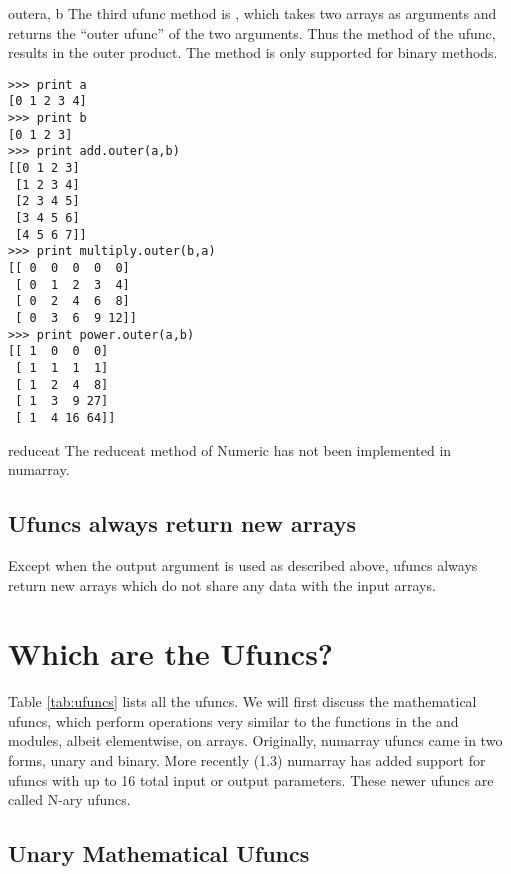 \begin{methoddesc}{outer}{a, b}
   The third ufunc method is , which takes two arrays as
   arguments and returns the ``outer ufunc'' of the two arguments. Thus the
    method of the  ufunc, results in the outer
   product. The  method is only supported for binary methods.
\begin{verbatim}
>>> print a
[0 1 2 3 4]
>>> print b
[0 1 2 3]
>>> print add.outer(a,b)
[[0 1 2 3]
 [1 2 3 4]
 [2 3 4 5]
 [3 4 5 6]
 [4 5 6 7]]
>>> print multiply.outer(b,a)
[[ 0  0  0  0  0]
 [ 0  1  2  3  4]
 [ 0  2  4  6  8]
 [ 0  3  6  9 12]]
>>> print power.outer(a,b)
[[ 1  0  0  0]
 [ 1  1  1  1]
 [ 1  2  4  8]
 [ 1  3  9 27]
 [ 1  4 16 64]]
\end{verbatim}
\end{methoddesc}


\begin{methoddesc}{reduceat}{}
   The reduceat method of Numeric has not been implemented in numarray.
\end{methoddesc}

\subsection{Ufuncs always return new arrays}
\label{sec:ufuncs-always-return}

Except when the output argument is used as described above, ufuncs always
return new arrays which do not share any data with the input arrays.


\section{Which are the Ufuncs?}
\label{sec:which-are-ufuncs}

Table \ref{tab:ufuncs} lists all the ufuncs. We will first discuss the
mathematical ufuncs, which perform operations very similar to the functions in
the  and  modules, albeit elementwise, on arrays.
Originally,  numarray ufuncs came in two forms, unary and binary.  More
recently (1.3) numarray has added support for ufuncs with up to 16 total
input or output parameters.  These newer ufuncs are called N-ary ufuncs.

\subsection{Unary Mathematical Ufuncs}
\label{sec:unary-math-ufuncs}

